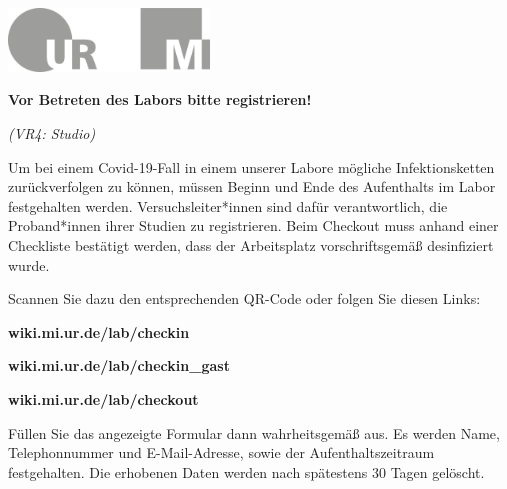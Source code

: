 \documentclass[24pt, a4paper, portrait]{article}
\begin{document}
\pagestyle{empty}

\raggedleft

\includegraphics[width=0.4\textwidth]{logo}

\vspace{1cm}
\sffamily
\centering
\huge

\textbf{Vor Betreten des Labors bitte registrieren!}

\vspace{0.5cm}
\Large
\textit{(VR4: Studio)}
\vspace{0.5cm}

\raggedright

Um bei einem Covid-19-Fall in einem unserer Labore mögliche Infektionsketten zurückverfolgen zu können, müssen Beginn und Ende des Aufenthalts im Labor festgehalten werden.
Versuchsleiter*innen sind dafür verantwortlich, die Proband*innen ihrer Studien zu registrieren.
Beim Checkout muss anhand einer Checkliste bestätigt werden, dass der Arbeitsplatz vorschriftsgemäß desinfiziert wurde.

\medskip

Scannen Sie dazu den entsprechenden QR-Code oder folgen Sie diesen Links:

\textbf{wiki.mi.ur.de/lab/checkin}

\textbf{wiki.mi.ur.de/lab/checkin\_gast}

\textbf{wiki.mi.ur.de/lab/checkout}

\medskip

Füllen Sie das angezeigte Formular dann wahrheitsgemäß aus.
Es werden Name, Telephonnummer und E-Mail-Adresse, sowie der Aufenthaltszeitraum festgehalten.
Die erhobenen Daten werden nach spätestens 30 Tagen gelöscht.

\vspace{1cm}
\centering
\end{document}
